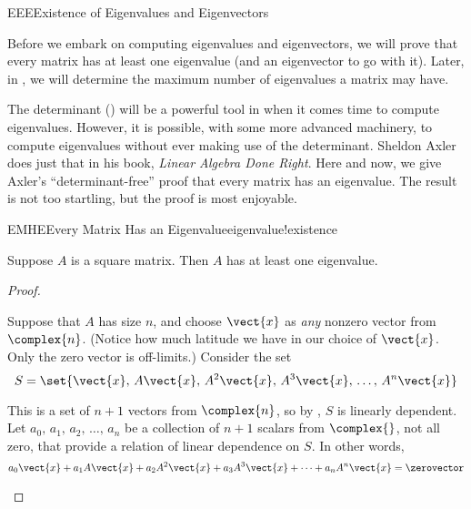 \begin{subsect}{EEE}{Existence of Eigenvalues and Eigenvectors}
%
\begin{para}Before we embark on computing eigenvalues and eigenvectors, we will prove that every matrix has at least one eigenvalue (and an eigenvector to go with it).  Later, in , we will determine the maximum number of eigenvalues a matrix may have.\end{para}
%
\begin{para}The determinant () will be a powerful tool in  when it comes time to compute eigenvalues.  However, it is possible, with some more advanced machinery, to compute eigenvalues without ever making use of the determinant.  Sheldon Axler does just that in his book, {\sl Linear Algebra Done Right}.  Here and now, we give Axler's ``determinant-free'' proof that every matrix has an eigenvalue.  The result is not too startling, but the proof is most enjoyable.\end{para}
%
\begin{theorem}{EMHE}{Every Matrix Has an Eigenvalue}{eigenvalue!existence}
\begin{para}Suppose $A$ is a square matrix.  Then $A$ has at least one eigenvalue.\end{para}
\end{theorem}
%
\begin{proof}
\begin{para}Suppose that $A$ has size $n$, and choose $\vect{x}$ as {\em any} nonzero vector from $\complex{n}$.  (Notice how much latitude we have in our choice of $\vect{x}$.  Only the zero vector is off-limits.)  Consider the set
%
\begin{equation*}
S=\set{\vect{x},\,A\vect{x},\,A^2\vect{x},\,A^3\vect{x},\,\ldots,\,A^n\vect{x}}
\end{equation*}
\end{para}
%
\begin{para}This is a set of $n+1$ vectors from $\complex{n}$, so by , $S$ is linearly dependent.  Let $a_0,\,a_1,\,a_2,\,\ldots,\,a_n$ be a collection of $n+1$ scalars from $\complex{\null}$, not all zero, that provide a relation of linear dependence on $S$.  In other words,
%
\begin{equation*}
a_0\vect{x}+a_1A\vect{x}+a_2A^2\vect{x}+a_3A^3\vect{x}+\cdots+a_nA^n\vect{x}=\zerovector
\end{equation*}
\end{para}

\end{proof}
\end{subsect}
